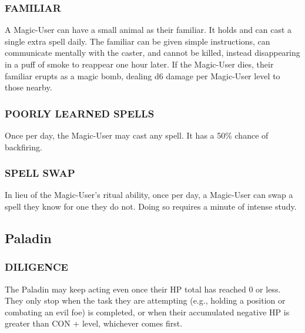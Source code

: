\documentclass[twoside]{article}
\begin{document}
\subsubsection*{\footnotesize{F}\scriptsize{AMILIAR}\normalsize}

A Magic-User can have a small animal as their familiar. It holds and can cast a single extra spell daily. The familiar can be given simple instructions, can communicate mentally with the caster, and cannot be killed, instead disappearing in a puff of smoke to reappear one hour later. If the Magic-User dies, their familiar erupts as a magic bomb, dealing d6 damage per Magic-User level to those nearby.

\subsubsection*{\footnotesize{P}\scriptsize{OORLY} \footnotesize{L}\scriptsize{EARNED} \footnotesize{S}\scriptsize{PELLS}\normalsize}

Once per day, the Magic-User may cast any spell. It has a 50\% chance of backfiring.

\subsubsection*{\footnotesize{S}\scriptsize{PELL} \footnotesize{S}\scriptsize{WAP}\normalsize}

In lieu of the Magic-User's ritual ability, once per day, a Magic-User can swap a spell they know for one they do not. Doing so requires a minute of intense study.

\subsection*{Paladin}

\subsubsection*{\footnotesize{D}\scriptsize{ILIGENCE}\normalsize}

The Paladin may keep acting even once their HP total has reached 0 or less. They only stop when the task they are attempting (e.g., holding a position or combating an evil foe) is completed, or when their accumulated negative HP is greater than CON + level, whichever comes first.
\end{document}

